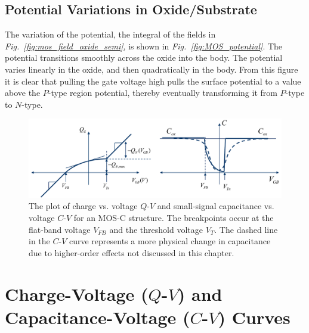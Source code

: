 \subsection{Potential Variations in Oxide/Substrate}
The variation of the potential, the integral of the fields in \emph{Fig.~\ref{fig:mos_field_oxide_semi}}, is shown in \emph{Fig.~\ref{fig:MOS_potential}}.  The potential transitions smoothly across the oxide into the body.  The potential varies linearly in the oxide, and then quadratically in the body.  From this figure it is clear that pulling the gate voltage high pulls the surface potential to a value above the $P$-type region potential, thereby eventually transforming it from $P$-type to $N$-type. 
\begin{figure}[H]
\centering
\includegraphics[width=\columnwidth]{mos_qv_cv}
\caption{The plot of charge vs. voltage $Q$-$V$ and small-signal capacitance vs. voltage $C$-$V$ for an MOS-C structure.  The breakpoints occur at the flat-band voltage $V_{FB}$ and the threshold voltage $V_T$.  The dashed line in the $C$-$V$ curve represents a more physical change in capacitance due to higher-order effects not discussed in this chapter.}
\label{fig:mos_qv_cv}
\end{figure}
\newpage
\section{Charge-Voltage (\texorpdfstring{$Q$-$V$}{Q-V}) and Capacitance-Voltage (\texorpdfstring{$C$-$V$}{C-V}) Curves}
